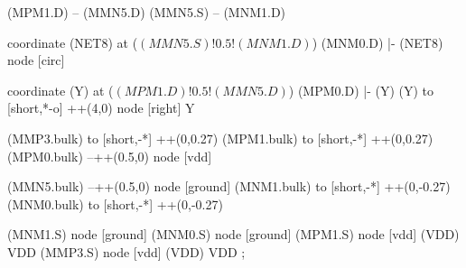 \begin{circuitikz}[american]
	(MPM1.D) -- (MMN5.D)
	(MMN5.S) -- (MNM1.D)
	
	coordinate (NET8) at ($(MMN5.S)!0.5!(MNM1.D)$)
	(MNM0.D) |- (NET8) node [circ] {}
	
	coordinate (Y) at ($(MPM1.D)!0.5!(MMN5.D)$)
	(MPM0.D) |- (Y)
	(Y) to [short,*-o] ++(4,0) node [right] {Y}
	
	(MMP3.bulk) to [short,-*] ++(0,0.27)
	(MPM1.bulk) to [short,-*] ++(0,0.27)	
	(MPM0.bulk) --++(0.5,0) node [vdd]{}
	
	(MMN5.bulk) --++(0.5,0) node [ground]{}
	(MNM1.bulk) to [short,-*] ++(0,-0.27) 
	(MNM0.bulk) to [short,-*] ++(0,-0.27) 


	(MNM1.S) node [ground] {}
	(MNM0.S) node [ground] {}
	(MPM1.S) node [vdd] (VDD) {VDD}
	(MMP3.S) node [vdd] (VDD) {VDD}
;

\end{circuitikz}
